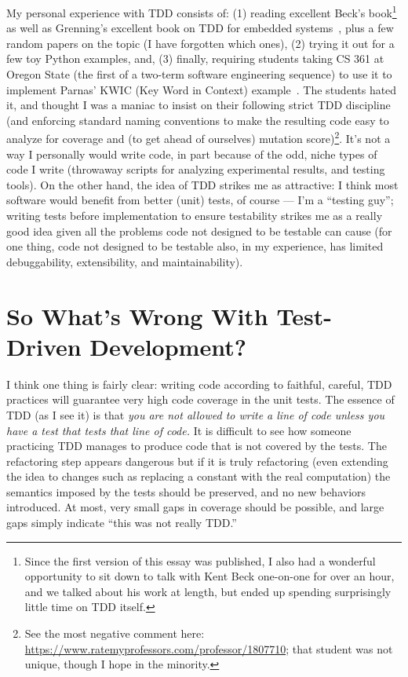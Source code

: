 \documentclass[sigplan,screen]{acmart}
\begin{document}
My personal experience with TDD consists of:  (1) reading excellent Beck's
book\footnote{Since the first version of this essay was published, I
  also had a wonderful opportunity to sit down to talk with Kent Beck
  one-on-one for over an hour, and we talked about his work at length, but
 ended up spending surprisingly little time on TDD itself.}
as well as
Grenning's excellent book on TDD for embedded systems~\cite{grenning},
plus a few random papers on the topic (I have forgotten which ones),
(2) trying it
out for a few toy Python examples, and, (3) finally, requiring students taking CS 361 at
Oregon State (the first of a two-term software engineering sequence)
to use it to implement Parnas' KWIC (Key Word in Context) example~\cite{parnas1972criteria}.
The students hated it, and thought I was a maniac to insist on their
following strict TDD discipline (and enforcing standard naming conventions
to make the resulting code easy to analyze for coverage and (to get
ahead of ourselves) mutation score)\footnote{See the most negative comment here:
  \url{https://www.ratemyprofessors.com/professor/1807710}; that
  student was not unique, though I hope in the minority.}.  It's not a way I personally
would write code, in part because of the odd, niche types of code I
write (throwaway scripts for analyzing experimental results, and
testing tools).  On the other hand, the idea of TDD strikes me as
attractive:  I think most software would benefit from better (unit)
tests, of course --- I'm a ``testing guy''; writing tests before
implementation to ensure testability strikes me as a really good idea
given all the problems code not designed to be testable can cause (for
one thing, code not designed to be testable also, in my experience,
has limited debuggability, extensibility, and maintainability).


\section{So What's Wrong With Test-Driven Development?}

I think one thing is fairly clear:  writing code according to
faithful, careful, TDD practices will guarantee very high code
coverage in the unit tests.  The essence of TDD (as I see it) is that
\emph{you are not allowed to write a line of code unless you have a
  test that tests that line of code.}  It is difficult to see how
someone practicing TDD manages to produce code that is not covered by
the tests.  The refactoring step appears dangerous but if it is truly
refactoring (even extending the idea to changes such as replacing a
constant with the real computation) the semantics imposed by the tests
should be preserved, and no new behaviors introduced.  At most, very
small gaps in coverage should be possible, and large gaps simply
indicate ``this was not really TDD.''
\end{document}
